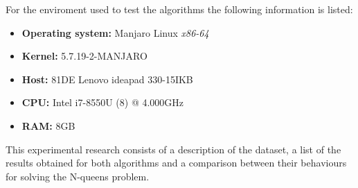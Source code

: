 \documentclass[]{llncs}
\begin{document}
For the enviroment used to test the algorithms the following information is listed:
\begin{itemize}
    \item \textbf{Operating system:} Manjaro Linux \textit{x86-64}
    \item \textbf{Kernel:} 5.7.19-2-MANJARO
    \item \textbf{Host:} 81DE Lenovo ideapad 330-15IKB
    \item \textbf{CPU:} Intel i7-8550U (8) @ 4.000GHz
    \item \textbf{RAM:} 8GB
\end{itemize}

This experimental research consists of a description of the dataset, a list of the results obtained for both algorithms and a comparison between their behaviours for solving the N-queens problem.
\end{document}
